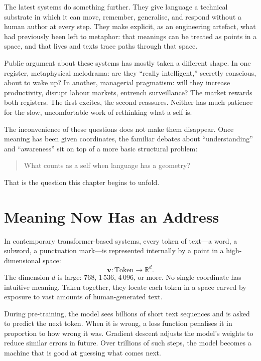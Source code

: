 \documentclass[12pt,a4paper]{report}
\begin{document}
The latest systems do something further. They give language a technical substrate in which it can move, remember, generalise, and respond without a human author at every step. They make explicit, as an engineering artefact, what had previously been left to metaphor: that meanings can be treated as points in a space, and that lives and texts trace paths through that space.

Public argument about these systems has mostly taken a different shape. In one register, metaphysical melodrama: are they ``really intelligent,'' secretly conscious, about to wake up? In another, managerial pragmatism: will they increase productivity, disrupt labour markets, entrench surveillance? The market rewards both registers. The first excites, the second reassures. Neither has much patience for the slow, uncomfortable work of rethinking what a self is.

The inconvenience of these questions does not make them disappear. Once meaning has been given coordinates, the familiar debates about ``understanding'' and ``awareness'' sit on top of a more basic structural problem:

\begin{quote}
What counts as a self when language has a geometry?
\end{quote}

That is the question this chapter begins to unfold.

\section{Meaning Now Has an Address}

In contemporary transformer-based systems, every token of text---a word, a subword, a punctuation mark---is represented internally by a point in a high-dimensional space:
\[
\mathbf{v} : \text{Token} \rightarrow \mathbb{R}^{d}.
\]
The dimension $d$ is large: 768, 1\,536, 4\,096, or more. No single coordinate has intuitive meaning. Taken together, they locate each token in a space carved by exposure to vast amounts of human-generated text.

During pre-training, the model sees billions of short text sequences and is asked to predict the next token. When it is wrong, a loss function penalises it in proportion to how wrong it was. Gradient descent adjusts the model's weights to reduce similar errors in future. Over trillions of such steps, the model becomes a machine that is good at guessing what comes next.
\end{document}
